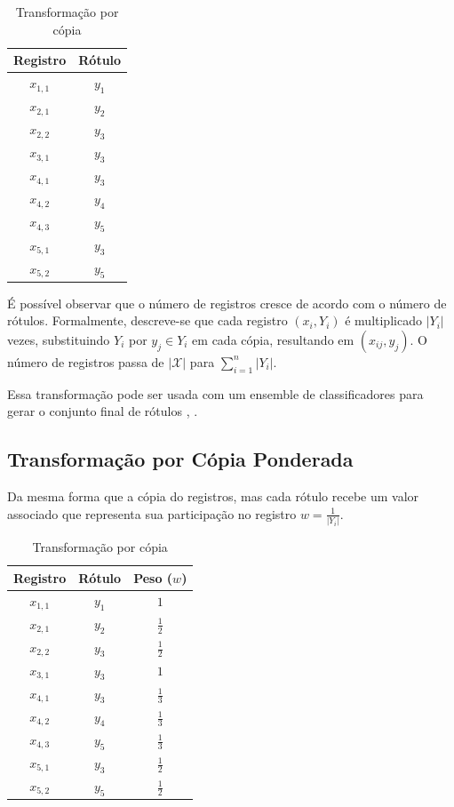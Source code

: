 \documentclass[runningheads,a4paper]{llncs}
\begin{document}
\begin{table}
	\centering
	\begin{tabular}{| c | c |}
		\hline
		\textbf{Registro} & \textbf{Rótulo} \\
		\hline
		$x_{1,1}$ & $y_1$ \\
		\hline
		$x_{2,1}$ & $y_2$ \\
		\hline
		$x_{2,2}$ & $y_3$ \\
		\hline
		$x_{3,1}$ & $y_3$ \\
		\hline
		$x_{4,1}$ & $y_3$ \\
		\hline
		$x_{4,2}$ & $y_4$ \\
		\hline
		$x_{4,3}$ & $y_5$ \\
		\hline
		$x_{5,1}$ & $y_3$ \\
		\hline
		$x_{5,2}$ & $y_5$ \\
		\hline
	\end{tabular}
	\caption{Transformação por cópia}
	\label{tab:excopia}
\end{table}

É possível observar que o número de registros cresce de acordo com o número de rótulos. Formalmente, descreve-se que cada registro $(x_i,Y_i)$ é multiplicado $|Y_i|$ vezes, substituindo $Y_i$ por $y_j \in Y_i$ em cada cópia, resultando em $(x_{ij}, y_j)$. O número de registros passa de $|\mathcal{X}|$ para $\sum_{i=1}^{n}|Y_i|$.

Essa transformação pode ser usada com um ensemble de classificadores para gerar o conjunto final de rótulos \cite{Joachims1998-zz}, \cite{Yang1999-ah}.

\subsection{Transformação por Cópia Ponderada}

Da mesma forma que a cópia do registros, mas cada rótulo recebe um valor associado que representa sua participação no registro $w = \frac{1}{|Y_i|}$.

\begin{table}
	\centering
	\begin{tabular}{| c | c | c |}
		\hline
		\textbf{Registro} & \textbf{Rótulo} & \textbf{Peso ($w$)} \\
		\hline
		$x_{1,1}$ & $y_1$ & $1$ \\
		\hline
		$x_{2,1}$ & $y_2$ & $\frac{1}{2}$ \\
		\hline
		$x_{2,2}$ & $y_3$ & $\frac{1}{2}$ \\
		\hline
		$x_{3,1}$ & $y_3$ & $1$ \\
		\hline
		$x_{4,1}$ & $y_3$ & $\frac{1}{3}$ \\
		\hline
		$x_{4,2}$ & $y_4$ & $\frac{1}{3}$ \\
		\hline
		$x_{4,3}$ & $y_5$ & $\frac{1}{3}$ \\
		\hline
		$x_{5,1}$ & $y_3$ & $\frac{1}{2}$ \\
		\hline
		$x_{5,2}$ & $y_5$ & $\frac{1}{2}$ \\
		\hline
	\end{tabular}
	\caption{Transformação por cópia}
	\label{tab:excopiapond}
\end{table}
\end{document}
